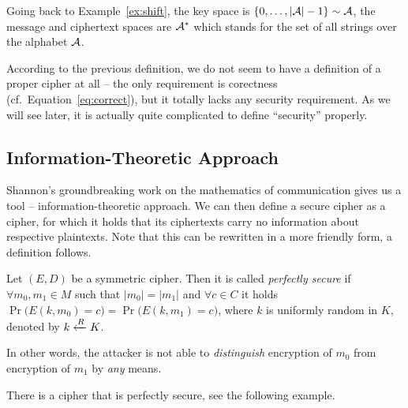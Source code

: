 \begin{note}
	Going back to Example~\ref{ex:shift}, the key space is $\{0 , \ldots , |{\cal A}|-1\}\sim\cal A$, the message and ciphertext spaces are ${\cal A}^*$ which stands for the set of all strings over the alphabet $\cal A$.
\end{note}

According to the previous definition, we do not seem to have a definition of a proper cipher at all -- the only requirement is corectness (cf.\ Equation~\ref{eq:correct}), but it totally lacks any security requirement. As we will see later, it is actually quite complicated to define ``security'' properly.



\subsection{Information-Theoretic Approach}

Shannon's groundbreaking work \cite{shannon1949mathematical} on the mathematics of communication gives us a tool -- information-theoretic approach. We can then define a secure cipher as a cipher, for which it holds that its ciphertexts carry no information about respective plaintexts. Note that this can be rewritten in a more friendly form, a definition follows.

\begin{defn}
\label{def:perfsec}
	Let $(E,D)$ be a symmetric cipher. Then it is called {\em perfectly secure} if $\forall m_0,m_1\in M$ such that $|m_0| = |m_1|$ and $\forall c\in C$ it holds $\Pr\bigl(E(k,m_0)=c\bigr) = \Pr\bigl(E(k,m_1)=c\bigr)$, where $k$ is uniformly random in $K$, denoted by $k\xleftarrow{R} K$.
\end{defn}

\begin{note}
\label{note:indist}
	In other words, the attacker is not able to {\em distinguish} encryption of $m_0$ from encryption of $m_1$ by {\em any} means.
\end{note}

There is a cipher that is perfectly secure, see the following example.


